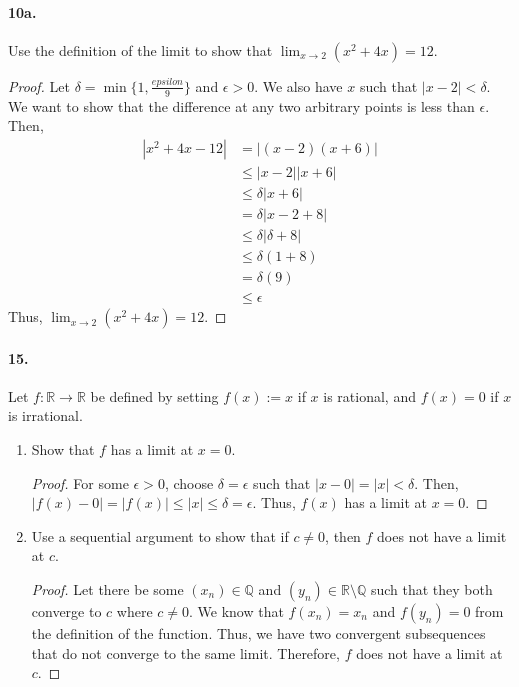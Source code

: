 \documentclass[12pt]{article}
\newcommand\R{\mathbb{R}}
\newcommand\Q{\mathbb{Q}}
\theoremstyle{remark}
\begin{document}
\paragraph{10a.} Use the definition of the limit to show that $\lim_{x \to 2} (x^2 + 4x) = 12$.
\begin{proof}
    Let $\delta = \min\{1, \frac{epsilon}{9}\}$ and $\epsilon > 0$. We also have $x$ such that $|x - 2| < \delta$. We want to show that the difference at any two arbitrary points is less than $\epsilon$. Then,
    \begin{align*}
        |x^2 + 4x - 12| &= |(x - 2)(x + 6)| \\
        &\leq |x - 2||x + 6| \\
        &\leq \delta|x + 6| \\
        &= \delta|x - 2 + 8| \\
        &\leq \delta|\delta + 8| \\
        &\leq \delta(1 + 8) \\
        &= \delta(9) \\
        &\leq \epsilon
    \end{align*}
    Thus, $\lim_{x \to 2} (x^2 + 4x) = 12$.
\end{proof}

\paragraph{15.} Let $f: \R \to \R$ be defined by setting $f(x) := x$ if $x$ is rational, and $f(x) = 0$ if $x$ is irrational.
\begin{enumerate}[label=(\alph*)]
    \item Show that $f$ has a limit at $x = 0$.
    \begin{proof}
        For some $\epsilon > 0$, choose $\delta = \epsilon$ such that $|x - 0| = |x| < \delta$. Then, $|f(x) - 0| = |f(x)| \leq |x| \leq \delta = \epsilon$. Thus, $f(x)$ has a limit at $x = 0$.
    \end{proof}
    \item Use a sequential argument to show that if $c \neq 0$, then $f$ does not have a limit at $c$.
    \begin{proof}
        Let there be some $(x_n) \in \Q$ and $(y_n) \in \R \setminus \Q$ such that they both converge to $c$ where $c \neq 0$. We know that $f(x_n) = x_n$ and $f(y_n) = 0$ from the definition of the function. Thus, we have two convergent subsequences that do not converge to the same limit. Therefore, $f$ does not have a limit at $c$.
    \end{proof}
\end{enumerate}
\end{document}
